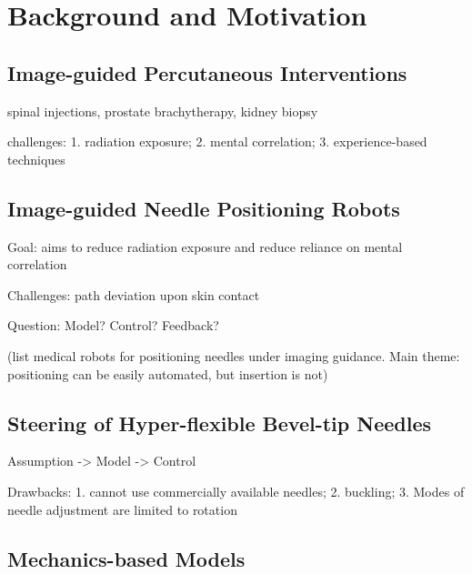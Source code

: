 \chapter{Background and Motivation} \label{chap:chap-1}


\section{Image-guided Percutaneous Interventions}
\label{sec:image-guided-percutanous-interventions}
\alert{spinal injections, prostate brachytherapy, kidney biopsy}

\alert{challenges: 1. radiation exposure; 2. mental correlation; 3. experience-based techniques}

\section{Image-guided Needle Positioning Robots}
\label{sec:image-guided-needle-positioning-robots}
\alert{Goal: aims to reduce radiation exposure and reduce reliance on mental correlation}

\alert{Challenges: path deviation upon skin contact}

\alert{Question: Model? Control? Feedback?}

\alert{(list medical robots for positioning needles under imaging guidance. Main theme: positioning can be easily automated, but insertion is not)}

\section{Steering of Hyper-flexible Bevel-tip Needles}
\label{sec:steering-of-hyperflexible-bevel-tip-needles}

\alert{Assumption -> Model -> Control}

\alert{Drawbacks: 1. cannot use commercially available needles; 2. buckling; 3. Modes of needle adjustment are limited to rotation}

\section{Mechanics-based Models}
\label{sec:mechanics-based-models}

